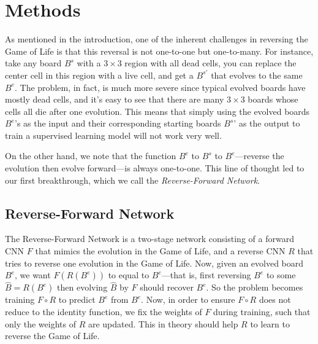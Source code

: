 \documentclass[conference]{IEEEtran}
\begin{document}
\section{Methods}
As mentioned in the introduction, one of the inherent challenges in reversing the Game of Life is that this reversal is not one-to-one but one-to-many. For instance, take any board $B^s$ with a $3 \times 3$ region with all dead cells, you can replace the center cell in this region with a live cell, and get a $B^{s'}$ that evolves to the same $B^e$. The problem, in fact, is much more severe since typical evolved boards have mostly dead cells, and it's easy to see that there are many $3 \times 3$ boards whose cells all die after one evolution. This means that simply using the evolved boards $B^e$'s as the input and their corresponding starting boards $B^s$' as the output to train a supervised learning model will not work very well.

On the other hand, we note that the function $B^e$ to $B^s$ to $B^e$---reverse the evolution then evolve forward---is always one-to-one. This line of thought led to our first breakthrough, which we call the \emph{Reverse-Forward Network}.

\subsection{Reverse-Forward Network}
\label{revfwdnet}
The Reverse-Forward Network is a two-stage network consisting of a forward CNN $F$ that mimics the evolution in the Game of Life, and a reverse CNN $R$ that tries to reverse one evolution in the Game of Life. Now, given an evolved board $B^e$, we want $F(R(B^e))$ to equal to $B^e$---that is, first reversing $B^e$ to some $\hat B = R(B^e)$ then evolving $\hat B$ by $F$ should recover $B^e$. So the problem becomes training $F \circ R$ to predict $B^e$ from $B^e$. Now, in order to ensure $F \circ R$ does not reduce to the identity function, we fix the weights of $F$ during training, such that only the weights of $R$ are updated. This in theory should help $R$ to learn to reverse the Game of Life.
\end{document}
